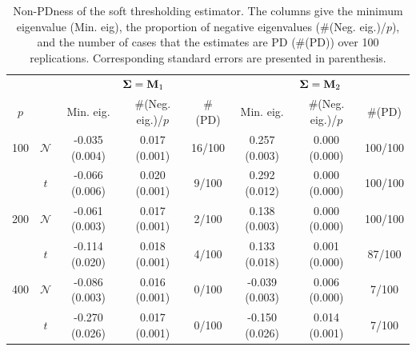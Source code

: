 \documentclass[times,sort&compress,3p]{elsarticle}
\begin{document}
\begin{table}[htb!]
{
\begin{center}
\begin{tabular}{cc|ccc|ccc}
\hline
& & \multicolumn{3}{c|}{${\bf \Sigma} = {\bf M}_1$}& \multicolumn{3}{c}{${\bf \Sigma} = {\bf M}_2$} \\
$p$ & & Min. eig. & \#(Neg. eig.)/$p$ & \#(PD) & Min. eig. & \#(Neg. eig.)/$p$ & \#(PD)  \\
\hline
 100 & $\mathcal{N}$  & -0.035 (0.004) & 0.017 (0.001) & 16/100 & 0.257 (0.003) & 0.000 (0.000) & 100/100 \\
     & $t$  & -0.066 (0.006) & 0.020 (0.001) & 9/100 & 0.292 (0.012) & 0.000 (0.000) & 100/100 \\
\hline
 200 & $\mathcal{N}$  & -0.061 (0.003) & 0.017 (0.001) & 2/100 & 0.138 (0.003) & 0.000 (0.000) & 100/100 \\
     & $t$  & -0.114 (0.020) & 0.018 (0.001) & 4/100 & 0.133 (0.018) & 0.001 (0.000) & 87/100 \\
\hline
 400 & $\mathcal{N}$  & -0.086 (0.003) & 0.016 (0.001) & 0/100 & -0.039 (0.003) & 0.006 (0.000) & 7/100 \\
     & $t$  & -0.270 (0.026) & 0.017 (0.001) & 0/100 & -0.150 (0.026) & 0.014 (0.001) & 7/100 \\
\hline
\end{tabular}
\caption{Non-PDness of the soft thresholding estimator. The columns give the minimum eigenvalue (Min. eig),
the proportion of negative eigenvalues (\#(Neg. eig.)/$p$), and the number of cases that the estimates are PD (\#(PD)) over
100 replications. Corresponding standard errors are presented in parenthesis.}
\label{table:softspectrum}
\end{center}
}
\end{table}
\end{document}
